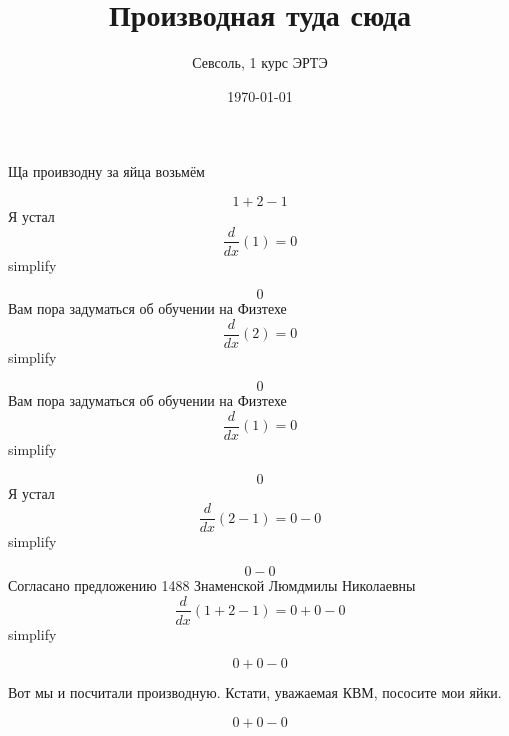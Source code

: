 \documentclass[12pt, a4paper]{article}
\begin{document}
\title{Производная туда сюда
}\author{Севсоль, 1 курс ЭРТЭ}
\date{\today}
\maketitle Ща проивзодну за яйца возьмём\

\begin{equation}
1+2-1
\end{equation}
Я устал
\begin{equation}
\frac{d}{dx}(1) = 0
\end{equation}
simplify

\begin{equation}
0
\end{equation}
Вам пора задуматься об обучении на Физтехе
\begin{equation}
\frac{d}{dx}(2) = 0
\end{equation}
simplify

\begin{equation}
0
\end{equation}
Вам пора задуматься об обучении на Физтехе
\begin{equation}
\frac{d}{dx}(1) = 0
\end{equation}
simplify

\begin{equation}
0
\end{equation}
Я устал
\begin{equation}
\frac{d}{dx}(2-1) = 0-0
\end{equation}
simplify

\begin{equation}
0-0
\end{equation}
Согласано предложению 1488 Знаменской Люмдмилы Николаевны
\begin{equation}
\frac{d}{dx}(1+2-1) = 0+0-0
\end{equation}
simplify

\begin{equation}
0+0-0
\end{equation}


Вот мы и посчитали производную. Кстати, уважаемая КВМ, пососите мои яйки.

\begin{equation}
0+0-0
\end{equation}
\end{document}
